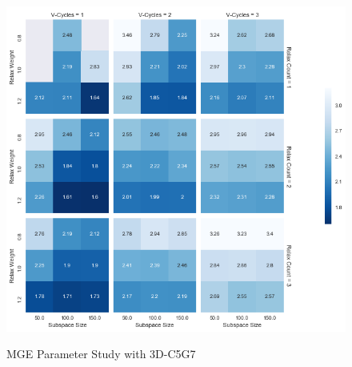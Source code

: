 \documentclass{article}                                                                           %
\begin{document}
\begin{figure}
\caption{MGE Parameter Study with 3D-C5G7}
\includegraphics[width=\textwidth]{Results/ml-parameters/analysis/parameter_study.png}
\label{fig:mge-dataframe}
\centering
\end{figure}
\end{document}
